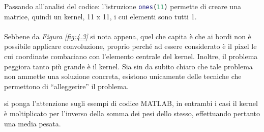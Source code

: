 \documentclass{subfiles}
\begin{document}
\noindent Passando all'analisi del codice: l'istruzione \lstinline[language = MATLAB]{ones(11)} permette di creare una matrice, quindi un kernel, 11 x 11,
i cui elementi sono tutti 1.
\\  \\
Sebbene da \emph{Figura \ref{fig:4.3}} si nota appena, quel che capita è che ai bordi non è possibile applicare convoluzione,
proprio perché ad essere considerato è il pixel le cui coordinate combaciano con l'elemento centrale del kernel.
Inoltre, il problema peggiora tanto più grande è il kernel. Sia sin da subito chiaro che tale problema non ammette una soluzione concreta,
esistono unicamente delle tecniche che permettono di ``alleggerire'' il problema.

\begin{Note*}
    si ponga l'attenzione sugli esempi di codice MATLAB, in entrambi i casi il kernel è moltiplicato per l'inverso della somma dei pesi dello stesso,
    effettuando pertanto una media pesata.
\end{Note*}



\end{document}
